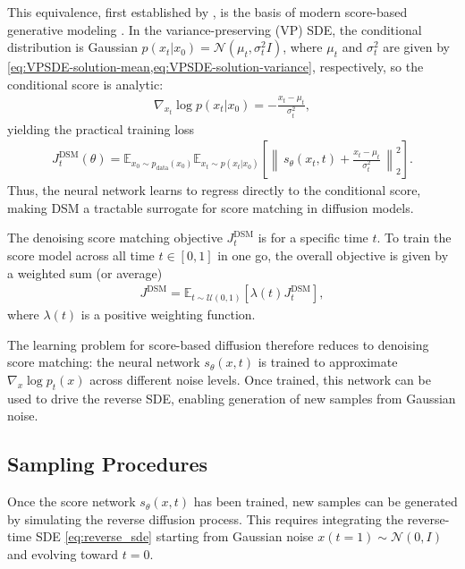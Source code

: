 \documentclass[a4paper,12pt]{article}
\begin{document}
This equivalence, first established by \citet{vincentConnectionScoreMatching2011}, is the basis of modern score-based generative modeling \citep{song2019GenerativeModelingEstimating,song2021ScoreBasedGenerativeModeling}. In the variance-preserving (VP) SDE, the conditional distribution is Gaussian \(p(x_t|x_0)=\mathcal{N}(\mu_t,\sigma_t^2I)\), where \(\mu_t\) and \(\sigma_t^2\) are given by \cref{eq:VPSDE-solution-mean,eq:VPSDE-solution-variance}, respectively, so the conditional score is analytic:
\begin{align*}
    \nabla_{x_t}\log p(x_t|x_0) = -\frac{x_t-\mu_t}{\sigma_t^2},
\end{align*}
yielding the practical training loss
\begin{align*}
    J_t^{\text{DSM}}(\theta)
    = \mathbb{E}_{x_0\sim p_{\text{data}}\left(x_0\right)}\mathbb{E}_{x_t\sim p\left(x_t|x_0\right)}\!\left[
        \left\|\,s_\theta(x_t,t) + \frac{x_t-\mu_t}{\sigma_t^2}\,\right\|_2^2
    \right].
\end{align*}
Thus, the neural network learns to regress directly to the conditional score, making DSM a tractable surrogate for score matching in diffusion models.

The denoising score matching objective \(J^{\text{DSM}}_t\) is for a specific time \(t\). To train the score model across all time \(t\in\left[0,1\right]\) in one go, the overall objective is given by a weighted sum (or average) \citep{song2021ScoreBasedGenerativeModeling}
\begin{align}\label{eq:DSM}
    J^{\text{DSM}}=\mathbb{E}_{t\sim\mathcal{U}(0,1)}\left[\lambda\!\left(t\right)J^{\text{DSM}}_t\right],
\end{align}
where \(\lambda\!\left(t\right)\) is a positive weighting function.

The learning problem for score-based diffusion therefore reduces to denoising score matching: the neural network \(s_\theta(x,t)\) is trained to approximate \(\nabla_x \log p_t(x)\) across different noise levels. Once trained, this network can be used to drive the reverse SDE, enabling generation of new samples from Gaussian noise.

\subsection{Sampling Procedures}
Once the score network \(s_\theta(x,t)\) has been trained, new samples can be generated by simulating the reverse diffusion process. This requires integrating the reverse-time SDE \eqref{eq:reverse_sde} starting from Gaussian noise \(x\!\left(t=1\right) \sim \mathcal{N}(0,I)\) and evolving toward \(t=0\).
\end{document}
